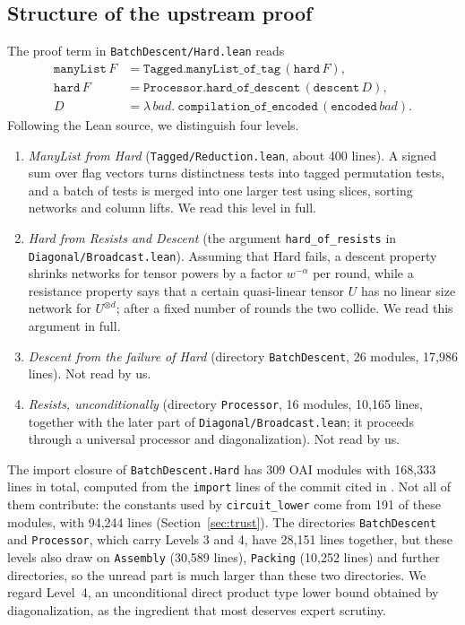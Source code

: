 \documentclass[11pt]{amsart}
\theoremstyle{definition}
\theoremstyle{remark}
\newcommand{\lean}[1]{\texttt{#1}}
\begin{document}
\subsection{Structure of the upstream proof}\label{sec:structure}
The proof term in \lean{BatchDescent/Hard.lean} reads
\begin{align*}
\mathtt{manyList}\,F &= \mathtt{Tagged.manyList\_of\_tag}\,(\mathtt{hard}\,F),\\
\mathtt{hard}\,F &= \mathtt{Processor.hard\_of\_descent}\,(\mathtt{descent}\,D),\\
D &= \lambda\,\mathit{bad}.\ \mathtt{compilation\_of\_encoded}\,(\mathtt{encoded}\,\mathit{bad}).
\end{align*}
Following the Lean source, we distinguish four levels.
\begin{enumerate}
\item \emph{ManyList from Hard} (\lean{Tagged/Reduction.lean}, about 400 lines). A signed sum over flag vectors turns distinctness tests into tagged permutation tests, and a batch of tests is merged into one larger test using slices, sorting networks and column lifts. We read this level in full.
\item \emph{Hard from Resists and Descent} (the argument \lean{hard\_of\_resists} in \lean{Diagonal/Broadcast.lean}). Assuming that Hard fails, a descent property shrinks networks for tensor powers by a factor $w^{-\alpha}$ per round, while a resistance property says that a certain quasi-linear tensor $U$ has no linear size network for $U^{\otimes d}$; after a fixed number of rounds the two collide. We read this argument in full.
\item \emph{Descent from the failure of Hard} (directory \lean{BatchDescent}, 26 modules, 17,986 lines). Not read by us.
\item \emph{Resists, unconditionally} (directory \lean{Processor}, 16 modules, 10,165 lines, together with the later part of \lean{Diagonal/Broadcast.lean}; it proceeds through a universal processor and diagonalization). Not read by us.
\end{enumerate}
The import closure of \lean{BatchDescent.Hard} has 309 OAI modules with 168,333 lines in total, computed from the \lean{import} lines of the commit cited in \cite{OAImath}. Not all of them contribute: the constants used by \lean{circuit\_lower} come from 191 of these modules, with 94,244 lines (Section~\ref{sec:trust}). The directories \lean{BatchDescent} and \lean{Processor}, which carry Levels 3 and 4, have 28,151 lines together, but these levels also draw on \lean{Assembly} (30,589 lines), \lean{Packing} (10,252 lines) and further directories, so the unread part is much larger than these two directories. We regard Level~4, an unconditional direct product type lower bound obtained by diagonalization, as the ingredient that most deserves expert scrutiny.
\end{document}
